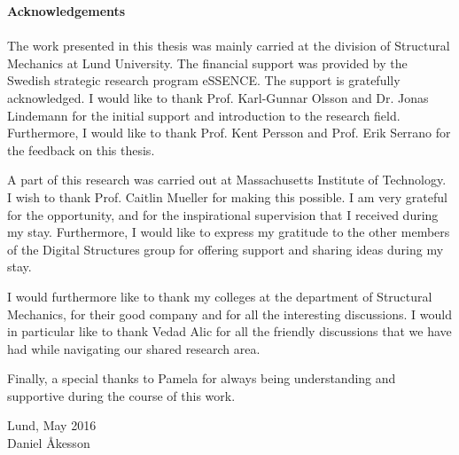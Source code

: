 \null\vfill

{\Huge \textbf{Acknowledgements}} \\ \\

The work presented in this thesis was mainly carried at the division of Structural Mechanics at Lund University. The financial support was provided by the Swedish strategic research program eSSENCE. The support is gratefully acknowledged. I would like to thank Prof. Karl-Gunnar Olsson and Dr. Jonas Lindemann for the initial support and introduction to the research field. Furthermore, I would like to thank Prof. Kent Persson and Prof. Erik Serrano for the feedback on this thesis.

A part of this research was carried out at Massachusetts Institute of Technology. I wish to thank Prof. Caitlin Mueller for making this possible. I am very grateful for the opportunity, and for the inspirational supervision that I received during my stay. Furthermore, I would like to express my gratitude to the other members of the Digital Structures group for offering support and sharing ideas during my stay.

I would furthermore like to thank my colleges  at the department of Structural Mechanics, for their good company and for all the interesting discussions. I would in particular like to thank Vedad Alic for all the friendly discussions that we have had while navigating our shared research area.

Finally, a special thanks to Pamela for always being understanding and supportive during the course of this work.


\vspace{1cm}

\begin{flushright}
Lund, May 2016\\Daniel Åkesson
\end{flushright}

\vfill\vfill\vfill\vfill\null